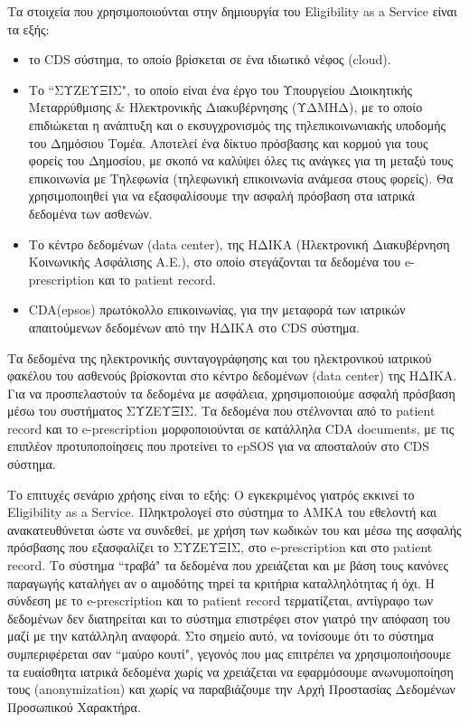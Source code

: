 		Τα στοιχεία που χρησιμοποιούνται στην δημιουργία του Eligibility as a Service είναι τα εξής:
		
		\begin{itemize}
		
		\item το CDS σύστημα, το οποίο βρίσκεται σε ένα ιδιωτικό νέφος (cloud).

		\item Το ``ΣΥΖΕΥΞΙΣ", το οποίο είναι ένα έργο του Υπουργείου Διοικητικής Μεταρρύθμισης \& Ηλεκτρονικής Διακυβέρνησης (ΥΔΜΗΔ), με το οποίο επιδιώκεται η ανάπτυξη και ο εκσυγχρονισμός της τηλεπικοινωνιακής υποδομής του Δημόσιου Τομέα. Αποτελεί  ένα δίκτυο πρόσβασης και κορμού για τους φορείς του Δημοσίου, με σκοπό να καλύψει όλες τις ανάγκες για τη μεταξύ τους επικοινωνία με  Τηλεφωνία (τηλεφωνική επικοινωνία ανάμεσα στους φορείς). Θα χρησιμοποιηθεί για να εξασφαλίσουμε την ασφαλή πρόσβαση στα ιατρικά δεδομένα των ασθενών.
		
		\item Το κέντρο δεδομένων (data center), της ΗΔΙΚΑ (Ηλεκτρονική Διακυβέρνηση Κοινωνικής Ασφάλισης Α.Ε.), στο οποίο στεγάζονται τα δεδομένα του e-prescription και το patient record.
		

		\item CDA(epsos) πρωτόκολλο επικοινωνίας, για την μεταφορά των ιατρικών απαιτούμενων δεδομένων από την ΗΔΙΚΑ στο CDS σύστημα.
			
		\end{itemize}				
		
		
		
		Τα δεδομένα της ηλεκτρονικής συνταγογράφησης και του ηλεκτρονικού ιατρικού φακέλου του ασθενούς βρίσκονται στο κέντρο δεδομένων (data center) της ΗΔΙΚΑ. Για να προσπελαστούν τα δεδομένα με ασφάλεια, χρησιμοποιούμε ασφαλή πρόσβαση μέσω του συστήματος ΣΥΖΕΥΞΙΣ. Τα δεδομένα που στέλνονται από το patient record και το e-prescription μορφοποιούνται σε κατάλληλα CDA documents, με τις επιπλέον προτυποποίησεις που προτείνει το epSOS για να αποσταλούν στο CDS σύστημα.
		
		Το επιτυχές σενάριο χρήσης είναι το εξής: Ο εγκεκριμένος γιατρός εκκινεί το Eligibility as a Service. Πληκτρολογεί στο σύστημα το ΑΜΚΑ του εθελοντή και ανακατευθύνεται ώστε να συνδεθεί, με χρήση των κωδικών του και μέσω της ασφαλής πρόσβασης που εξασφαλίζει το ΣΥΖΕΥΞΙΣ, στο e-prescription και στο patient record. Το σύστημα ``τραβά" τα δεδομένα που χρειάζεται και με βάση τους κανόνες παραγωγής καταλήγει αν ο αιμοδότης τηρεί τα κριτήρια καταλληλότητας ή όχι. Η σύνδεση με το e-prescription και το patient record τερματίζεται, αντίγραφο των δεδομένων δεν διατηρείται και το σύστημα επιστρέφει στον γιατρό την απόφαση του μαζί με την κατάλληλη αναφορά. Στο σημείο αυτό, να τονίσουμε ότι το σύστημα συμπεριφέρεται σαν ``μαύρο κουτί", γεγονός που μας επιτρέπει να χρησιμοποιήσουμε τα ευαίσθητα ιατρικά δεδομένα χωρίς να χρειάζεται να εφαρμόσουμε ανωνυμοποίηση τους (anonymization) και χωρίς να παραβιάζουμε την Αρχή Προστασίας Δεδομένων Προσωπικού Χαρακτήρα. 
		
		
		
		
		
		
		
		
		
		
		
		
		